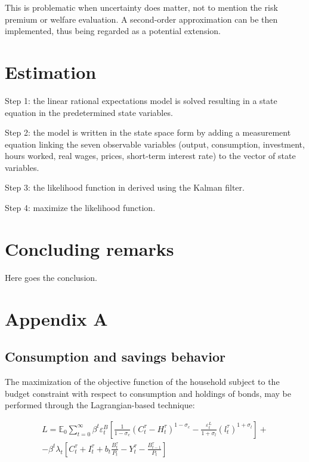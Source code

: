\documentclass{pracamgr}
\numberwithin{equation}{section}
\begin{document}
This is problematic when uncertainty does matter, not to mention the risk premium or welfare evaluation. A second-order approximation can be then implemented, thus being regarded as a potential extension.

\chapter{Estimation}

Step 1: the linear rational expectations model is solved resulting in a state equation in the predetermined state variables.

Step 2: the model is written in the state space form by adding a measurement equation linking the seven observable variables (output, consumption, investment, hours worked, real wages, prices, short-term interest rate) to the vector of state variables.

Step 3: the likelihood function in derived using the Kalman filter.

Step 4: maximize the likelihood function.

\chapter{Concluding remarks} \label{Concluding remarks}

Here goes the conclusion.

\newpage

\nocite{*}


\newpage

\chapter*{Appendix A} \label{Appendix A}

\section*{Consumption and savings behavior}

The maximization of the objective function of the household subject to the budget constraint with respect to consumption and holdings of bonds, may be performed through the Lagrangian-based technique:

\begin{equation}
\begin{split}
L = \mathbb{E}_{0} \sum\limits_{t=0}^{\infty} \beta^{t} \varepsilon_{t}^{B} \left[ \frac{1}{1-\sigma_{c}} \left( C_{t}^{\tau} - H_{t}^{\tau} \right)^{1-\sigma_{c}} - \frac{\varepsilon_{t}^{L}}{1+\sigma_{l}} \left( l_{t}^{\tau} \right)^{1+\sigma_{l}} \right] + \\
- \beta^{t} \lambda_{t} \left[ C_{t}^{\tau} + I_{t}^{\tau} + b_{t} \frac{B_{t}^{\tau}}{P_{t}} - Y_{t}^{\tau} - \frac{B_{t-1}^{\tau}}{P_{t}} \right]
\end{split}
\end{equation}
\end{document}
